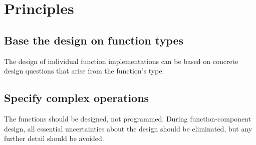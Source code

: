 \section{Principles}
\subsection{Base the design on function types}
The design of individual function implementations can be based on concrete design questions that arise from the function's type.

\subsection{Specify complex operations}
The functions should be designed, not programmed. During function-component design, all essential uncertainties about the design should be eliminated, but any further detail should be avoided.